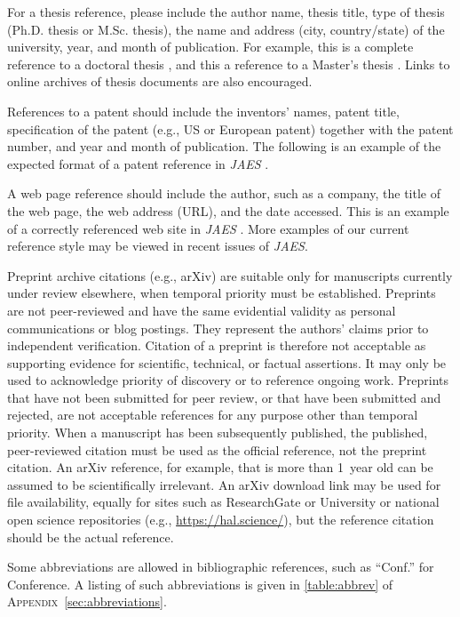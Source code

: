 \documentclass[fleqn]{jaes}
\begin{document}
For a thesis reference, please include the author name, thesis title, type of thesis (Ph.D. thesis or M.Sc. thesis), the name and address (city, country/state) of the university, year, and month of publication. For example, this is a complete reference to a doctoral thesis \cite{a_PhD_thesis}, and this a reference to a Master's thesis \cite{an_MSc_thesis}. Links to online archives of thesis documents are also encouraged.

References to a patent should include the inventors’ names, patent title, specification of the patent (e.g., US or European patent) together with the patent number, and year and month of publication. The following is an example of the expected format of a patent reference in \emph{JAES} \cite{a_patent}. 

A web page reference should include the author, such as a company, the title of the web page, the web address (URL), and the date accessed. This is an example of a correctly referenced web site in \emph{JAES} \cite{a_web_page}. More examples of our current reference style may be viewed in recent issues of \emph{JAES}.

Preprint archive citations (e.g., arXiv) are suitable only for manuscripts currently under review elsewhere, when temporal priority must be established. Preprints are not peer-reviewed and have the same evidential validity as personal communications or blog postings. They represent the authors’ claims prior to independent verification. Citation of a preprint is therefore not acceptable as supporting evidence for scientific, technical, or factual assertions. It may only be used to acknowledge priority of discovery or to reference ongoing work. Preprints that have not been submitted for peer review, or that have been submitted and rejected, are not acceptable references for any purpose other than temporal priority. When a manuscript has been subsequently published, the published, peer-reviewed citation must be used as the official reference, not the preprint citation. An arXiv reference, for example, that is more than 1~year old can be assumed to be scientifically irrelevant. An arXiv download link may be used for file availability, equally for sites such as ResearchGate or University or national open science repositories (e.g., \url{https://hal.science/}), but the reference citation should be the actual reference. 

Some abbreviations are allowed in bibliographic references, such as ``Conf.'' for Conference. A listing of such abbreviations is given in \cref{table:abbrev} of \textsc{Appendix}~\ref{sec:abbreviations}.
\end{document}
